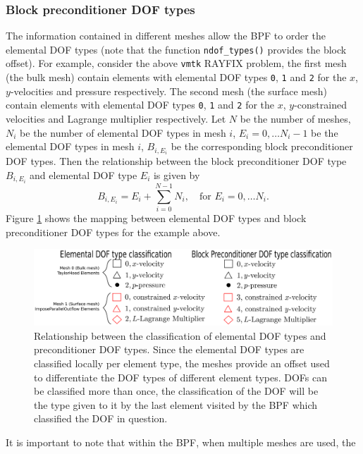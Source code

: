 \subsubsection{Block preconditioner DOF types}
The information contained in different meshes allow the BPF to order the elemental
DOF types (note that the function \texttt{ndof\_\allowbreak types()} provides 
the block offset). For example, consider the above \texttt{vmtk} RAYFIX problem, 
the first mesh (the bulk mesh) contain elements with elemental DOF types 
\texttt{0}, \texttt{1} and \texttt{2} for the $x$, $y$-velocities and pressure
respectively. The second mesh (the surface mesh) contain elements with elemental
DOF types \texttt{0}, \texttt{1} and \texttt{2} for the $x$, $y$-constrained 
velocities and Lagrange multiplier respectively. Let $N$ be the 
number of meshes, $N_i$ be the number of elemental DOF types in mesh $i$,
$E_i = 0, \ldots N_i - 1$ be the elemental DOF types in mesh $i$, $B_{i,E_i}$ 
be the corresponding block preconditioner DOF types. Then the relationship 
between the block preconditioner DOF type $B_{i,E_i}$ and elemental DOF type
$E_i$ is given by
\begin{equation*}
  B_{i,E_i} = E_i + \sum_{i=0}^{N - 1} N_i, \quad \mbox{for } E_i = 0,\ldots N_i.
\end{equation*}
Figure \ref{fig:elemental_to_block_dof_classification} shows the mapping between
elemental DOF types and block preconditioner DOF types for the example above.
\begin{figure}[H]
\centering
\includegraphics[width=1\textwidth]{./pic/elemental_to_block_dof_classification.pdf}
\caption{Relationship between the classification of elemental DOF types and
  preconditioner DOF types. Since the elemental DOF types are classified
  locally per element type, the meshes provide an offset used to differentiate
  the DOF types of different element types. DOFs can be classified more than
  once, the classification of the DOF will be the type given to it by the last
  element visited by the BPF which classified the DOF in question.}
\label{fig:elemental_to_block_dof_classification}
\end{figure}
It is important to note that within the BPF, when multiple meshes are used, the
